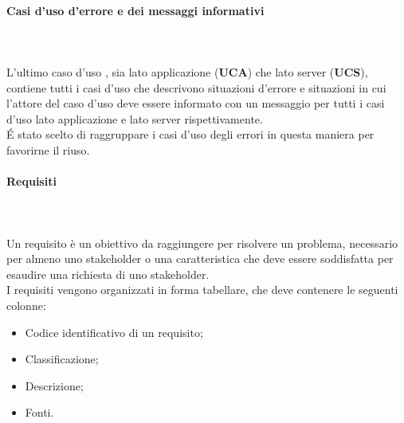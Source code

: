 \paragraph{Casi d'uso d'errore e dei messaggi informativi}\mbox{}\\ \\
L'ultimo caso d'uso , sia lato applicazione (\textbf{UCA}) che lato server (\textbf{UCS}), contiene tutti i casi d'uso che descrivono situazioni d'errore e situazioni in cui l'attore del caso d'uso deve essere informato con un messaggio per tutti i casi d'uso lato applicazione e lato server rispettivamente.\\
\'E stato scelto di raggruppare i casi d'uso degli errori in questa maniera per favorirne il riuso.
\paragraph{Requisiti}\mbox{}\\ \\
Un requisito è un obiettivo da raggiungere per risolvere un problema, necessario per almeno uno stakeholder o una caratteristica che deve essere soddisfatta per esaudire una richiesta di uno stakeholder. \\
I requisiti vengono organizzati in forma tabellare, che deve contenere le seguenti colonne:
\begin{itemize}
	\item Codice identificativo di un requisito;
	\item Classificazione;
	\item Descrizione;
	\item Fonti.
\end{itemize}


